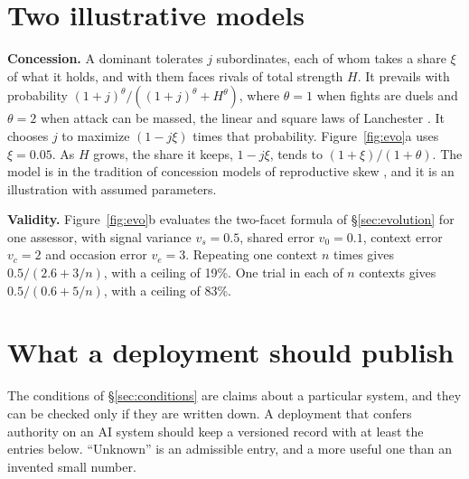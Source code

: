 \documentclass[10pt,twocolumn]{article}
\theoremstyle{plain}
\theoremstyle{definition}
\newcommand{\para}[1]{\smallskip\noindent\textbf{#1}\enspace}
\begin{document}
\section{Two illustrative models}\label{app:models}

\para{Concession.} A dominant tolerates $j$ subordinates, each of whom takes a share $\xi$ of
what it holds, and with them faces rivals of total strength $H$. It prevails with
probability $(1+j)^{\theta}/((1+j)^{\theta}+H^{\theta})$, where $\theta=1$ when fights are
duels and $\theta=2$ when attack can be massed, the linear and square laws of Lanchester
\cite{lanchester1916}. It chooses $j$ to maximize $(1-j\xi)$ times that probability.
Figure~\ref{fig:evo}a uses $\xi=0.05$. As $H$ grows, the share it keeps, $1-j\xi$, tends to
$(1+\xi)/(1+\theta)$. The model is in the tradition of concession models of reproductive
skew \cite{vehrencamp1983}, and it is an illustration with assumed parameters.

\para{Validity.} Figure~\ref{fig:evo}b evaluates the two-facet formula of
\S\ref{sec:evolution} for one assessor, with signal variance $v_s=0.5$, shared error
$v_0=0.1$, context error $v_c=2$ and occasion error $v_e=3$. Repeating one context $n$ times
gives $0.5/(2.6+3/n)$, with a ceiling of 19\%. One trial in each of $n$ contexts gives
$0.5/(0.6+5/n)$, with a ceiling of 83\%.

\section{What a deployment should publish}\label{app:record}

The conditions of \S\ref{sec:conditions} are claims about a particular system, and they can
be checked only if they are written down. A deployment that confers authority on an AI
system should keep a versioned record with at least the entries below. ``Unknown'' is an
admissible entry, and a more useful one than an invented small number.
\end{document}
